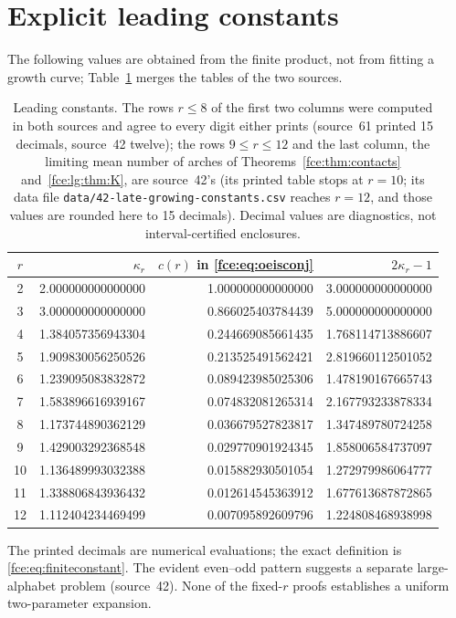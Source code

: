 \documentclass[11pt,a4paper]{article}
\numberwithin{equation}{section}
\theoremstyle{definition}\newtheorem{definition}[theorem]{Definition}
\theoremstyle{remark}\newtheorem{remark}[theorem]{Remark}
\begin{document}
\section{Explicit leading constants}\label{fce:sec:constants}
The following values are obtained from the finite product, not from
fitting a growth curve; Table~\ref{fce:tab:constants} merges the tables of
the two sources.
\begin{table}[ht]
\centering\small
\begin{tabular}{crrr}
\toprule
$r$ & $\kappa_r$ & $c(r)$ in \eqref{fce:eq:oeisconj} & $2\kappa_r-1$\\
\midrule
2&2.000000000000000&1.000000000000000&3.000000000000000\\
3&3.000000000000000&0.866025403784439&5.000000000000000\\
4&1.384057356943304&0.244669085661435&1.768114713886607\\
5&1.909830056250526&0.213525491562421&2.819660112501052\\
6&1.239095083832872&0.089423985025306&1.478190167665743\\
7&1.583896616939167&0.074832081265314&2.167793233878334\\
8&1.173744890362129&0.036679527823817&1.347489780724258\\
9&1.429003292368548&0.029770901924345&1.858006584737097\\
10&1.136489993032388&0.015882930501054&1.272979986064777\\
11&1.338806843936432&0.012614545363912&1.677613687872865\\
12&1.112404234469499&0.007095892609796&1.224808468938998\\
\bottomrule
\end{tabular}
\caption{Leading constants. The rows $r\le8$ of the first two columns were
computed in both sources and agree to every digit either prints (source~61
printed 15 decimals, source~42 twelve); the rows $9\le r\le12$ and the last
column, the limiting mean number of arches of
Theorems~\ref{fce:thm:contacts} and~\ref{fce:lg:thm:K}, are source~42's
(its printed table stops at $r=10$; its data file
\texttt{data/42-late-growing-}\allowbreak\texttt{constants.csv} reaches $r=12$, and those
values are rounded here to 15 decimals). Decimal values are diagnostics,
not interval-certified enclosures.}\label{fce:tab:constants}
\end{table}

The printed decimals are numerical evaluations; the exact definition is
\eqref{fce:eq:finiteconstant}. The evident even--odd pattern suggests a
separate large-alphabet problem (source~42). None of the fixed-$r$ proofs
establishes a uniform two-parameter expansion.
\end{document}
